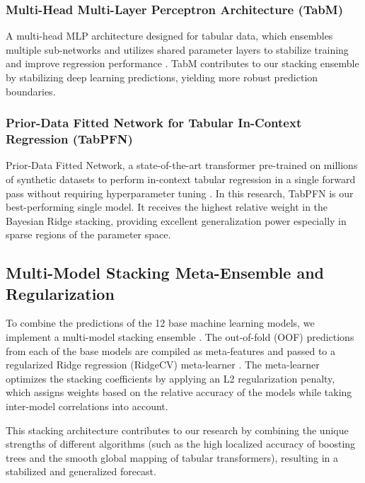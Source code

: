 \documentclass[twocolumn,linenumbers,floatfix]{aastex701}
\begin{document}
\subsubsection{Multi-Head Multi-Layer Perceptron Architecture (TabM)}
A multi-head MLP architecture designed for tabular data, which ensembles multiple sub-networks and utilizes shared parameter layers to stabilize training and improve regression performance \citep{Gorishniy2024}. TabM contributes to our stacking ensemble by stabilizing deep learning predictions, yielding more robust prediction boundaries.

\subsubsection{Prior-Data Fitted Network for Tabular In-Context Regression (TabPFN)}
Prior-Data Fitted Network, a state-of-the-art transformer pre-trained on millions of synthetic datasets to perform in-context tabular regression in a single forward pass without requiring hyperparameter tuning \citep{Hollmann2022}. In this research, TabPFN is our best-performing single model. It receives the highest relative weight in the Bayesian Ridge stacking, providing excellent generalization power especially in sparse regions of the parameter space.

\subsection{Multi-Model Stacking Meta-Ensemble and Regularization}
\label{sec:stacking}
To combine the predictions of the 12 base machine learning models, we implement a multi-model stacking ensemble \citep{Wolpert1992}. The out-of-fold (OOF) predictions from each of the base models are compiled as meta-features and passed to a regularized Ridge regression (RidgeCV) meta-learner \citep{MacKay1992, Tipping2001}. The meta-learner optimizes the stacking coefficients by applying an L2 regularization penalty, which assigns weights based on the relative accuracy of the models while taking inter-model correlations into account. 

This stacking architecture contributes to our research by combining the unique strengths of different algorithms (such as the high localized accuracy of boosting trees and the smooth global mapping of tabular transformers), resulting in a stabilized and generalized forecast. 
\end{document}
